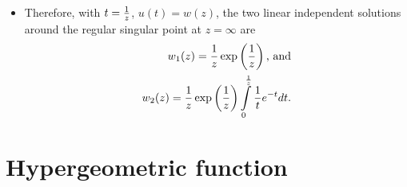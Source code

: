 {\begin{enumerate}
\begin{itemize}
\begin{eqnarray*}
         \tilde p_1(t)&=&-\left({1\over t}+1\right),
      \end{eqnarray*}
      yields
      \begin{eqnarray*}
         v'(t)+v(t)\left(2{e^t(1+t)\over te^t}-{1\over t}-1\right)&=&0\\
         v'(t)+v(t)\left(2{(1+t)\over t}-{1\over t}-1\right)&=&0\\
         v'(t)+v(t)\left({2\over t}+2-{1\over t}-1\right)&=&0\\
         v'(t)+v(t)\left({1\over t}+1\right)&=&0\\
         {dv\over dt}&=&-v\left(1+{1\over t}\right)\\
         {dv\over v}&=&-\left(1+{1\over t}\right)dt
      \end{eqnarray*}
      Upon integration of both sides we obtain
      \begin{eqnarray*}
         \int{dv\over v}&=&-\int\left(1+{1\over t}\right)dt\\
         \log v&=&-(t+\log t)=-t-\log t\\
         v&=&\exp(-t-\log t)=e^{-t}e^{-\log t}={e^{-t}\over t},
      \end{eqnarray*}
      and hence an explicit form of $v(t)$:
      $$
         v(t)={1\over t}e^{-t}.
      $$
      If we insert this into the equation for  $u_2$ we   obtain
      $$
         u_2(t)=te^t\int_0^t{1\over s}e^{-s}ds.
      $$

\item Therefore, with $  t={1\over z}$, $u(t)=w(z)$,
      the two linear independent solutions around the regular singular point at $z=\infty$ are
      \begin{equation}
      \begin{split}
         w_1(z)={1\over z}\exp\left({1\over z}\right)\textrm{, and}\\
         w_2(z)={1\over z}\exp\left({1\over z}\right)
                \int\limits_0^{1\over z}{1\over t}e^{-t}dt.
      \end{split}
      \end{equation}
\end{itemize}

\end{enumerate}
\eexample
}




\section{Hypergeometric function}

